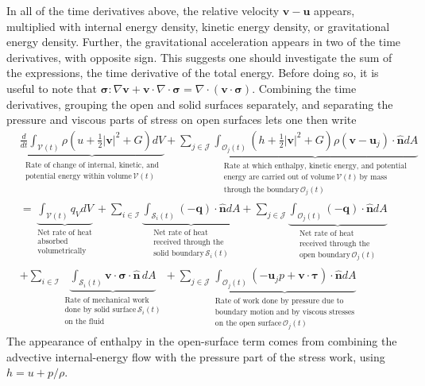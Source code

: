 In all of the time derivatives above, the relative velocity $\bm{v}-\bm{u}$ appears, multiplied with internal energy density, kinetic energy density, or gravitational energy density. Further, the gravitational acceleration appears in two of the time derivatives, with opposite sign. This suggests one should investigate the sum of the expressions, the time derivative of the total energy. Before doing so, it is useful to note that $\bm{\sigma}:\nabla\bm{v}+\bm{v}\cdot\nabla\cdot\bm{\sigma}=\nabla\cdot(\bm{v}\cdot\bm{\sigma})$. Combining the time derivatives, grouping the open and solid surfaces separately, and separating the pressure and viscous parts of stress on open surfaces lets one then write 
\begin{align}
    &\underbrace{\frac{d}{dt}\int_{\mathcal{V}(t)}\rho (u+\frac{1}{2}|\bm{v}|^2+G)dV}_{\substack{\text{Rate of change of internal, kinetic, and}\\\text{potential energy within volume}\,\mathcal{V}(t)}}+\sum_{j\in\mathcal{J}}\underbrace{\int_{\mathcal{O}_j(t)} (h+\frac{1}{2}|\bm{v}|^2+G)\rho(\bm{v}-\bm{u}_j)\cdot\bm{\hat{n}}dA}_{\substack{\text{Rate at which enthalpy, kinetic energy, and potential}\\\text{energy are carried out of volume}\,\mathcal{V}(t)\,\text{by mass}\\\text{through the boundary}\,\mathcal{O}_j(t)}}\nonumber
    \\
    &=\underbrace{\int_{\mathcal{V}(t)}q_VdV}_{\substack{\text{Net rate of heat}\\\text{absorbed}\\\text{volumetrically}}}+\sum_{i\in\mathcal{I}}\underbrace{\int_{\mathcal{S}_i(t)}(-\bm{q})\cdot\bm{\hat{n}}dA}_{\substack{\text{Net rate of heat}\\\text{received through the}\\\text{solid boundary}\,\mathcal{S}_i(t)}}+\sum_{j\in\mathcal{J}}\underbrace{\int_{\mathcal{O}_j(t)}(-\bm{q})\cdot\bm{\hat{n}}dA}_{\substack{\text{Net rate of heat}\\\text{received through the}\\\text{open boundary}\,\mathcal{O}_j(t)}}\nonumber
    \\    &+\sum_{i\in\mathcal{I}}\underbrace{\int_{\mathcal{S}_i(t)}\bm{v}\cdot\bm{\sigma}\cdot\bm{\hat{n}}\,dA}_{\substack{\text{Rate of mechanical work}\\\text{done by solid surface}\,\mathcal{S}_i(t)\\\text{on the fluid}}}
    +\sum_{j\in\mathcal{J}}\underbrace{\int_{\mathcal{O}_j(t)}\left(-\bm{u}_jp+\bm{v}\cdot\bm{\tau}\right)\cdot\bm{\hat{n}}dA}_{\substack{\text{Rate of work done by pressure due to}\\\text{boundary motion and by viscous stresses}\\\text{on the open surface}\,\mathcal{O}_j(t)}}
\end{align}
The appearance of enthalpy in the open-surface term comes from combining the advective internal-energy flow with the pressure part of the stress work, using $h=u+p/\rho$.

